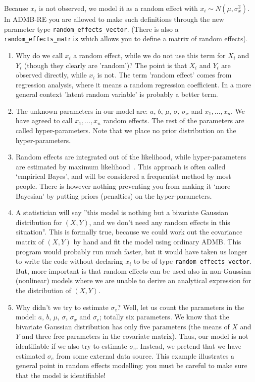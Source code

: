 \documentclass[12pt,letter,reqno]{book}
\begin{document}
Because $x_i$ is not observed, we model it as a random effect with $x_i\sim
N(\mu ,\sigma_{x}^{2})$. In ADMB-RE you are allowed to make such definitions
through the new parameter type \texttt{random\_effects\_vector}.
 (There is also a \texttt{random\_effects\_matrix}
which allows you to define a matrix of random effects).

\begin{enumerate}
\item Why do we call $x_i$ a random effect, while we do not use this term
for $X_i$ and $Y_i$ (though they clearly are 'random')? The point is that $X_i$ and $Y_i$ are observed directly,
while $x_i$ is not. The term 'random effect' comes from regression analysis, where it means a random regression
coefficient. In a more general context 'latent random variable' is probably a better term.

\item The unknown parameters in our model are: $a$, $b$, $\mu $, $\sigma $, $\sigma_{x}$ and $x_{1},\ldots ,x_{n}$.
We have agreed to call $x_{1},\ldots,x_{n}$ random effects. The rest of the parameters are called
hyper-parameters. Note that we place no prior distribution on the hyper-parameters.

\item Random effects are integrated out of the likelihood, while
hyper-parameters are estimated by maximum likelihood~. This approach is often called
`empirical Bayes', and will be considered a frequentist method by most people. There is however nothing
preventing you from making it `more Bayesian' by putting priors (penalties) on the hyper-parameters.

\item A statistician will say ''this model is nothing but a bivariate
Gaussian distribution for $(X,Y)$, and we don't need any random effects in
this situation''. This is formally true, because we could work out the covariance
matrix of $(X,Y)$ by hand and fit the model using ordinary ADMB. This
program would probably run much faster, but it would have
taken us longer to write the code without declaring $x_i$ to be of type
\texttt{random\_effects\_vector}. But, more important is that random effects
can be used also in non-Gaussian (nonlinear) models where we are unable to
derive an analytical expression for the distribution of $(X,Y)$.

\item Why didn't we try to estimate $\sigma_{e}$? Well, let us count the
parameters in the model: $a$, $b$, $\mu $, $\sigma $, $\sigma_{x}$ and $\sigma_{e}$; totally six parameters. We
know that the bivariate Gaussian distribution has only five parameters (the means of $X$ and $Y$ and three free parameters in
the covariate matrix). Thus, our model is not identifiable if we also try to estimate $\sigma_{e}$. Instead, we
pretend that we have estimated $\sigma_{e}$ from some external data source. This example illustrates a general
point in random effects modelling: you must be careful to make sure that the model is identifiable!\quad
\end{enumerate}
\end{document}
